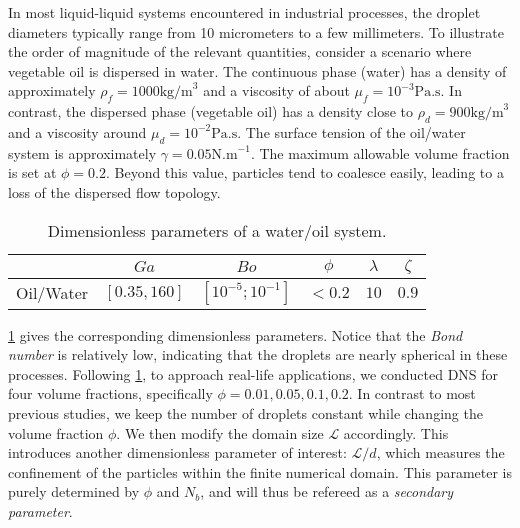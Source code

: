 In most liquid-liquid systems encountered in industrial processes, the droplet diameters typically range from 10 micrometers to a few millimeters. To illustrate the order of magnitude of the relevant quantities, consider a scenario where vegetable oil is dispersed in water. The continuous phase (water) has a density of approximately $\rho_f = 1000 \text{kg/m}^3$ and a viscosity of about $\mu_f = 10^{-3} \text{Pa.s}$. In contrast, the dispersed phase (vegetable oil) has a density close to $\rho_d = 900 \text{kg/m}^3$ and a viscosity around $\mu_d = 10^{-2} \text{Pa.s}$.
The surface tension of the oil/water system is approximately $\gamma = 0.05 \text{N.m}^{-1}$. The maximum allowable volume fraction is set at $\phi = 0.2$. Beyond this value, particles tend to coalesce easily, leading to a loss of the dispersed flow topology.%
\begin{table}[h!]
    \centering
    \caption{Dimensionless parameters of a water/oil system.}
    \begin{tabular}{|c||c|c|c|c|c|}
        \hline&$Ga$&$Bo$&$\phi$&$\lambda$&$\zeta$\\ \hline
        \hline Oil/Water&$[0.35,160]$&$[10^{-5};10^{-1}]$&$<0.2$&$10$&$0.9$\\ \hline
    \end{tabular}
    \label{tab:parameters_exp}
\end{table}
\ref{tab:parameters_exp} gives the corresponding dimensionless parameters.  
Notice that the \textit{Bond number} is relatively low, indicating that the droplets are nearly spherical in these processes.
Following \ref{tab:parameters_exp}, to approach real-life applications, we conducted DNS for four volume fractions, specifically $\phi = 0.01,0.05,0.1,0.2$.
In contrast to most previous studies, we keep the number of droplets constant while changing the volume fraction $\phi$. 
We then modify the domain size $\mathcal{L}$ accordingly. 
This introduces another dimensionless parameter of interest: $\mathcal{L}/d$, which measures the confinement of the particles within the finite numerical domain. 
This parameter is purely determined by $\phi$ and $N_b$, and will thus be refereed as a \textit{secondary parameter}.

